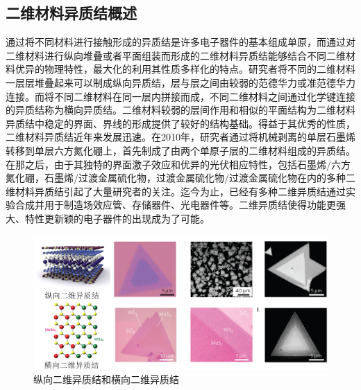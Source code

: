 \subsection{二维材料异质结概述}

    通过将不同材料进行接触形成的异质结是许多电子器件的基本组成单原，而通过对二维材料进行纵向堆叠或者平面组装而形成的二维材料异质结能够结合不同二维材料优异的物理特性，最大化的利用其性质多样化的特点。研究者将不同的二维材料一层层堆叠起来可以制成纵向异质结，层与层之间由较弱的范德华力或准范德华力连接。而将不同二维材料在同一层内拼接而成，不同二维材料之间通过化学键连接的异质结称为横向异质结。二维材料较弱的层间作用和相似的平面结构为二维材料异质结中稳定的界面、界线的形成提供了较好的结构基础。得益于其优秀的性质，二维材料异质结近年来发展迅速。在2010年，研究者通过将机械剥离的单层石墨烯转移到单层六方氮化硼上，首先制成了由两个单原子层的二维材料组成的异质结。在那之后，由于其独特的界面激子效应和优异的光伏相应特性，包括石墨烯/六方氮化硼，石墨烯/过渡金属硫化物，过渡金属硫化物/过渡金属硫化物在内的多种二维材料异质结引起了大量研究者的关注。迄今为止，已经有多种二维异质结通过实验合成并用于制造场效应管、存储器件、光电器件等。二维异质结使得功能更强大、特性更新颖的电子器件的出现成为了可能。
    \begin{figure}[htb]
        \includegraphics{pic/INTRO_heterostructure_VertAndLate.png}
        \caption{纵向二维异质结和横向二维异质结}
    \end{figure}


